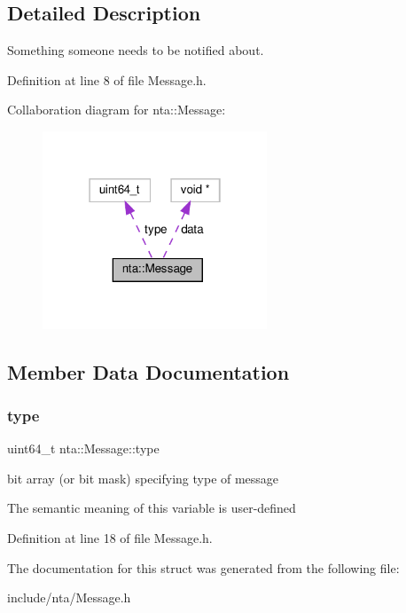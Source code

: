 \subsection{Detailed Description}
Something someone needs to be notified about. 

Definition at line 8 of file Message.\+h.



Collaboration diagram for nta\+:\+:Message\+:
\nopagebreak
\begin{figure}[H]
\begin{center}
\leavevmode
\includegraphics[width=190pt]{d3/dbb/structnta_1_1Message__coll__graph}
\end{center}
\end{figure}


\subsection{Member Data Documentation}
\mbox{\label{structnta_1_1Message_a512ef14eaa86f830247f8194cbbd4f83}} 
\subsubsection{\texorpdfstring{type}{type}}
{\footnotesize\ttfamily uint64\+\_\+t nta\+::\+Message\+::type}

bit array (or bit mask) specifying type of message

The semantic meaning of this variable is user-\/defined 

Definition at line 18 of file Message.\+h.



The documentation for this struct was generated from the following file\+:\begin{DoxyCompactItemize}
\item 
include/nta/Message.\+h\end{DoxyCompactItemize}
